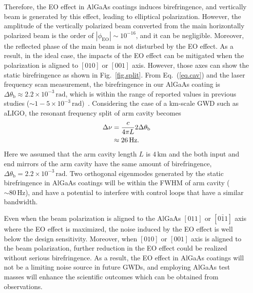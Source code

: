 Therefore, the EO effect in AlGaAs coatings induces birefringence, and vertically beam is generated by this effect, leading to elliptical polarization.
However, the amplitude of the vertically polarized beam converted from the main horizontally polarized beam is the order of $|\phi_{\mathrm{EO}}|\sim10^{-16}$, and it can be negligible.
Moreover, the reflected phase of the main beam is not disturbed by the EO effect.
As a result, in the ideal case, the impacts of the EO effect can be mitigated when the polarization is aligned to $[010]$ or $[001]$ axis.
However, those axes can show the static birefringence as shown in Fig.~\ref{fig.split}.
From Eq.~(\ref{eq.cav}) and the laser frequency scan measurement, the birefringence in our AlGaAs coating is $\Delta\theta_{\mathrm{b}}\approx2.2\times10^{-3}\, \mathrm{rad}$, which is within the range of reported values in previous studies ($\sim1-5\times10^{-3}\, \mathrm{rad}$)~\cite{cole:2013, cole:2016}.
Considering the case of a km-scale GWD such as aLIGO, the resonant frequency split of arm cavity becomes
\begin{align}
    \Delta\nu &= \frac{c}{4\pi L}2\Delta\theta_{\mathrm{b}} \notag \\
    &\approx 26\, \mathrm{Hz}.
\end{align}
Here we assumed that the arm cavity length $L$ is $4\, \mathrm{km}$ and the both input and end mirrors of the arm cavity have the same amount of birefringence, $\Delta\theta_{\mathrm{b}}=2.2\times10^{-3}\, \mathrm{rad}$.
Two orthogonal eigenmodes generated by the static birefringence in AlGaAs coatings will be within the FWHM of arm cavity ($\sim80\, \mathrm{Hz}$), and have a potential to interfere with control loops that have a similar bandwidth.

Even when the beam polarization is aligned to the AlGaAs $[011]$ or $[0\bar{1}1]$ axis where the EO effect is maximized, the noise induced by the EO effect is well below the design sensitivity.
Moreover, when $[010]$ or $[001]$ axis is aligned to the beam polarization, further reduction in the EO effect could be realized without serious birefringence.
As a result, the EO effect in AlGaAs coatings will not be a limiting noise source in future GWDs, and employing AlGaAs test masses will enhance the scientific outcomes which can be obtained from observations.

